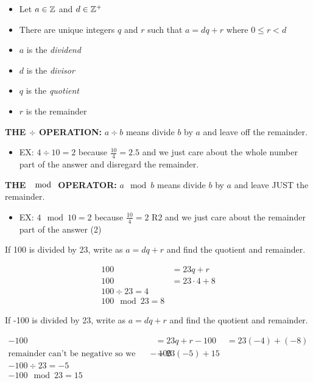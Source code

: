 \begin{itemize}
    \item Let $a \in \mathbb{Z}$ and $d \in \mathbb{Z}^+$
    \item There are unique integers $q$ and $r$ such that $a = dq + r$ where $0 \le r < d$
    \item $a$ is the \textit{dividend}
    \item $d$ is the \textit{divisor}
    \item $q$ is the \textit{quotient}
    \item $r$ is the remainder 
\end{itemize}

\textbf{THE $\div$ OPERATION:} $a \div b$ means divide $b$ by $a$ and leave off the remainder. 

\begin{itemize}
    \item EX: $4 \div 10 = 2$ because $\frac{10}{4} = 2.5$ and we just care about the whole number part of the answer and disregard the remainder.
\end{itemize}

\textbf{THE $\mod$ OPERATOR:} $a \mod b$ means divide $b$ by $a$ and leave JUST the remainder.

\begin{itemize}
    \item EX: $4 \mod 10 = 2$ because $\frac{10}{4} = 2\text{ R}2$ and we just care about the remainder part of the answer (2)
\end{itemize}

\begin{problem}
    If 100 is divided by 23, write as $a=dq+r$ and find the quotient and remainder.

    $$
    \begin{aligned}
        100 &= 23q + r\\
        100 &= 23 \cdot 4 + 8\\
        100 \div 23 = 4\\
        100 \mod 23 = 8
    \end{aligned}
    $$
\end{problem}

\begin{problem}
    If -100 is divided by 23, write as $a=dq+r$ and find the quotient and remainder.

    $$
    \begin{aligned}
        -100 &= 23q + r
        -100 &= 23(-4) + (-8)\\
        \text{remainder can't be negative so we add another factor of 23 to make the remanider positive}
        -100 &= 23(-5) + 15\\
        -100 \div 23 = -5\\
        -100 \mod 23 = 15
    \end{aligned}
    $$
\end{problem}


